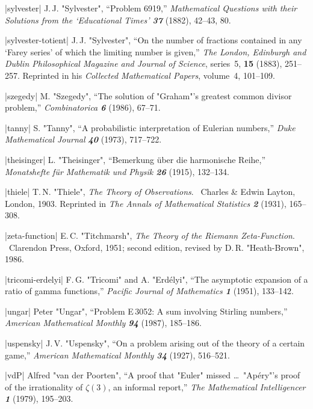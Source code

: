 \bib|sylvester|%
J.\,J. "Sylvester", ``Problem 6919,''
{\sl Mathematical Questions with their Solutions from the `Educational
Times'\/ \bf37} (1882), 42--43, 80.

\bib|sylvester-totient|%
J.\,J. "Sylvester", ``On the number of fractions contained in any `Farey series'
of which the limiting number is given,''
{\sl The London, Edinburgh and Dublin Philosophical
Magazine and Journal of Science}, series~5, {\bf15} (1883), 251--257.
Reprinted in his {\sl Collected Mathematical Papers}, volume~4, 101--109.

\bib|szegedy|%
M. "Szegedy", ``The solution of "Graham"'s greatest common divisor
problem,'' {\sl Combinatorica\/ \bf6} (1986), 67--71.


\bib|tanny|%
S. "Tanny", ``A probabilistic interpretation of Eulerian numbers,''
{\sl Duke Mathematical Journal\/ \bf40} (1973), 717--722.

\bib|theisinger|%
L. "Theisinger", ``Bemerkung \"uber die harmonische Reihe,''
{\sl Monatshefte f\"ur Mathematik und Physik\/ \bf26} (1915), 132--134.

\bib|thiele|%
T.\,N. "Thiele", {\sl The Theory of Observations}. \
Charles \& Edwin Layton, London, 1903. Reprinted in {\sl The
Annals of Mathematical Statistics\/ \bf2} (1931), 165--308.

\bib|zeta-function|%
E.\,C. "Titchmarsh", {\sl The Theory of the Riemann Zeta-Function}. \
Clarendon Press, Oxford, 1951; second edition, revised by D.\,R.
"Heath-Brown", 1986.

\bib|tricomi-erdelyi|%
F.\,G. "Tricomi" and A. "Erd\'elyi", ``The asymptotic expansion of a ratio
of gamma functions,'' {\sl Pacific Journal of Mathematics\/ \bf1} (1951),
133--142.

\bib|ungar|%
Peter "Ungar", ``Problem E\,3052: A sum involving Stirling numbers,''
{\sl American Mathematical Monthly\/ \bf94} (1987), 185--186.

\bib|uspensky|%
J.\,V. "Uspensky", ``On a problem arising out of the theory of a certain game,''
{\sl American Mathematical Monthly\/ \bf34} (1927), 516--521.

\bib|vdP|%
Alfred "van der Poorten", ``A proof that "Euler" missed \dots\ "Ap\'ery"'s
proof of the irrationality of $\zeta(3)$, an informal report,''
{\sl The Mathematical Intelligencer\/ \bf1} (1979), 195--203.

